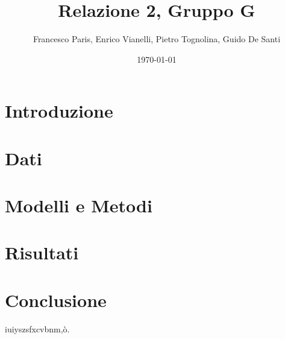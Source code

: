 \documentclass[twocolumn]{article}
\title{Relazione 2, Gruppo G}
\author{Francesco Paris, Enrico Vianelli, Pietro Tognolina, Guido De Santi}
\date{\today}
\begin{document}
\maketitle

\section{Introduzione}

\section{Dati}

\section{Modelli e Metodi}

\section{Risultati}

\section{Conclusione}
iuiyszsfxcvbnm,ò.
\end{document}
